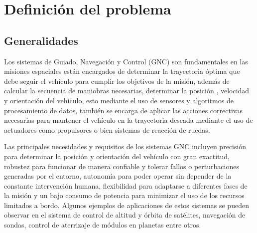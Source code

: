 \documentclass[12pt]{article}
\begin{document}
\newpage

\section{Definición del problema}

\subsection{Generalidades}

Los sistemas de Guiado, Navegación y Control (GNC) son fundamentales en las misiones espaciales están encargados de determinar la trayectoria óptima que debe seguir el vehículo para cumplir los objetivos de la misión, además de calcular la secuencia de maniobras necesarias, determinar la posición , velocidad y orientación del vehículo, esto mediante el uso de sensores y algoritmos de procesamiento de datos, también se encarga de aplicar las acciones correctivas necesarias para mantener el vehículo en la trayectoria deseada mediante el uso de actuadores como propulsores o bien sistemas de reacción de ruedas. 

Las principales necesidades y requisitos de los sistemas GNC incluyen precisión para determinar la posición y orientación del vehículo con gran exactitud, robustez para funcionar de manera confiable y tolerar fallos o perturbaciones generadas por el entorno, autonomía para poder operar sin depender de la constante intervención humana, flexibilidad para adaptarse a diferentes fases de la misión y un bajo consumo de potencia para minimizar el uso de los recursos limitados a bordo. Algunos ejemplos de aplicaciones de estos sistemas se pueden observar en el sistema de control de altitud y órbita de satélites, navegación de sondas, control de aterrizaje de módulos en planetas entre otros.
\end{document}
